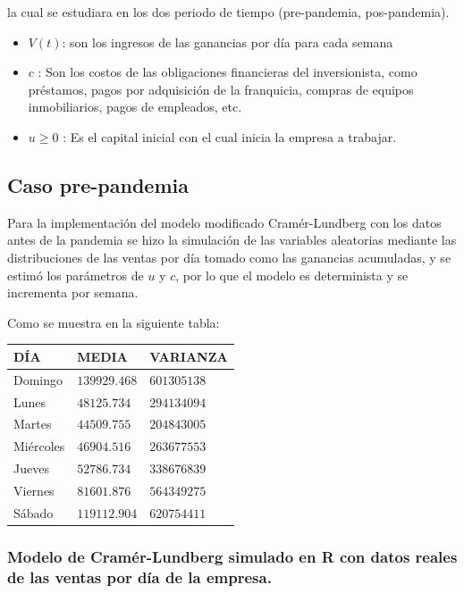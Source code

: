 \documentclass[
  us-letterpaper,
]{scrreprt}
\theoremstyle{plain}
\theoremstyle{plain}
\theoremstyle{definition}
\theoremstyle{remark}
\begin{document}
la cual se estudiara en los dos periodo de tiempo (pre-pandemia,
pos-pandemia).

\begin{itemize}
\item
  \(V(t)\): son los ingresos de las ganancias por día para cada semana
\item
  \(c\) : Son los costos de las obligaciones financieras del
  inversionista, como préstamos, pagos por adquisición de la franquicia,
  compras de equipos inmobiliarios, pagos de empleados, etc.
\item
  \(u \geq 0\) : Es el capital inicial con el cual inicia la empresa a
  trabajar.
\end{itemize}

\subsection{Caso pre-pandemia}\label{caso-pre-pandemia}

Para la implementación del modelo modificado Cramér-Lundberg con los
datos antes de la pandemia se hizo la simulación de las variables
aleatorias mediante las distribuciones de las ventas por día tomado como
las ganancias acumuladas, y se estimó los parámetros de \(u\) y \(c\),
por lo que el modelo es determinista y se incrementa por semana.

Como se muestra en la siguiente tabla:

\begin{longtable}[]{@{}lll@{}}
\toprule\noalign{}
DÍA & MEDIA & VARIANZA \\
\midrule\noalign{}
\endhead
\bottomrule\noalign{}
\endlastfoot
Domingo & \(139929.468\) & \(601305138\) \\
Lunes & \(48125.734\) & \(294134094\) \\
Martes & \(44509.755\) & \(204843005\) \\
Miércoles & \(46904.516\) & \(263677553\) \\
Jueves & \(52786.734\) & \(338676839\) \\
Viernes & \(81601.876\) & \(564349275\) \\
Sábado & \(119112.904\) & \(620754411\) \\
\end{longtable}

\subsubsection{Modelo de Cramér-Lundberg simulado en R con datos reales
de las ventas por día de la
empresa.}\label{modelo-de-cramuxe9r-lundberg-simulado-en-r-con-datos-reales-de-las-ventas-por-duxeda-de-la-empresa.}
\end{document}
